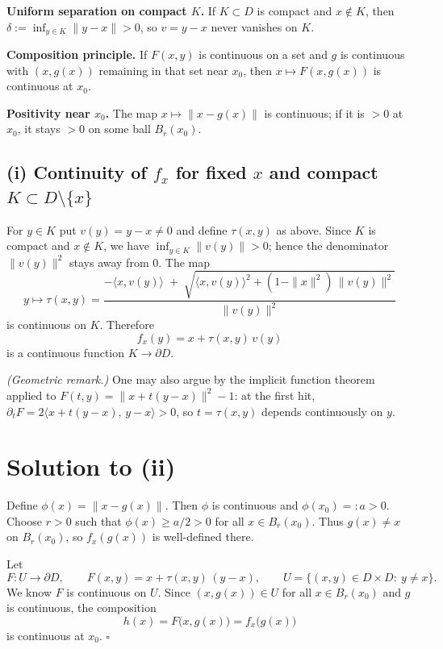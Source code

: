 \documentclass[12pt,a4paper]{article}
\newcommand{\qed}{\hfill$\square$}
\theoremstyle{plain}
\theoremstyle{definition}
\theoremstyle{remark}
\theoremstyle{remark}
\begin{document}
\smallskip

\noindent\textbf{Uniform separation on compact $K$.}
If $K\subset D$ is compact and $x\notin K$, then
$\delta:=\inf_{y\in K}\|y-x\|>0$, so $v=y-x$ never vanishes on $K$.

\smallskip

\noindent\textbf{Composition principle.}
If $F(x,y)$ is continuous on a set and $g$ is continuous with $(x,g(x))$ remaining in that set near $x_0$,
then $x\mapsto F(x,g(x))$ is continuous at $x_0$.

\smallskip

\noindent\textbf{Positivity near $x_0$.}
The map $x\mapsto \|x-g(x)\|$ is continuous; if it is $>0$ at $x_0$, it stays $>0$ on some ball $B_r(x_0)$.

\bigskip

\subsection*{(i) Continuity of $f_x$ for fixed $x$ and compact $K \subset D \setminus \{x\}$}

For $y \in K$ put $v(y)=y-x\neq 0$ and define $\tau(x,y)$ as above.
Since $K$ is compact and $x\notin K$, we have $\inf_{y\in K}\|v(y)\|>0$; hence the denominator $\|v(y)\|^2$ stays away
from $0$. The map
\[
y \longmapsto \tau(x,y)
=
\frac{-\langle x, v(y)\rangle \;+\; \sqrt{\langle x, v(y)\rangle^{2} + (1-\|x\|^{2})\,\|v(y)\|^{2}}}
{\|v(y)\|^{2}}
\]
is continuous on $K$. Therefore
\[
f_x(y)=x+\tau(x,y)\,v(y)
\]
is a continuous function $K \to \partial D$.

\smallskip

\emph{(Geometric remark.)} One may also argue by the implicit function theorem applied to
$F(t,y)=\|x+t(y-x)\|^{2}-1$: at the first hit, $\partial_t F=2\langle x+t(y-x),\, y-x\rangle>0$,
so $t=\tau(x,y)$ depends continuously on $y$.

\bigskip

\section*{Solution to (ii)}

Define $\phi(x)=\|x-g(x)\|$. Then $\phi$ is continuous and $\phi(x_0)=:a>0$.
Choose $r>0$ such that $\phi(x)\ge a/2>0$ for all $x\in B_r(x_0)$.
Thus $g(x)\ne x$ on $B_r(x_0)$, so $f_x(g(x))$ is well-defined there.

Let
\[
F:U\to\partial D,\qquad F(x,y)=x+\tau(x,y)\,(y-x),\qquad
U=\{(x,y)\in D\times D:\ y\ne x\}.
\]
We know $F$ is continuous on $U$. Since $(x,g(x))\in U$ for all $x\in B_r(x_0)$ and $g$ is continuous,
the composition
\[
h(x)=F\bigl(x,g(x)\bigr)=f_x\bigl(g(x)\bigr)
\]
is continuous at $x_0$. \qed
\end{document}
